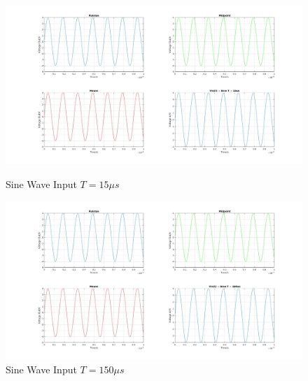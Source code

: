 \documentclass[11pt,a4paper]{article}
\begin{document}
\begin{figure}[h]
	\vspace{-5mm}
	\centering
	\includegraphics[width=\textwidth]{Ex1_Figs/sin15.jpg}
	\vspace{-6mm}
	\caption{Sine Wave Input $T = 15 \mu s$}
	\label{fig:RL5}
	\includegraphics[width=\textwidth]{Ex1_Figs/sin150.jpg}
	\vspace{-6mm}
	\caption{Sine Wave Input $T = 150 \mu s$}
	\label{fig:RL6}
\end{figure}

\pagebreak
\end{document}
